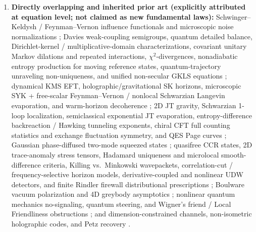 \documentclass[11pt,a4paper]{article}
\theoremstyle{definition}
\theoremstyle{remark}
\newcommand{\1}{\mathbf{1}}
\begin{document}
\begin{enumerate}
  \item \textbf{Directly overlapping and inherited prior art (explicitly attributed at equation level; not claimed as new fundamental laws):} Schwinger--Keldysh / Feynman--Vernon influence functionals and microscopic noise normalizations \cite{Schwinger1961,Keldysh1964,FeynmanVernon1963,CaldeiraLeggett1983,WuLee2005,SiebererBuchholdDiehl2016,Sieberer2023}; Davies weak-coupling semigroups, quantum detailed balance, Dirichlet-kernel / multiplicative-domain characterizations, covariant unitary Markov dilations and repeated interactions, $\chi^2$-divergences, nonadiabatic entropy production for moving reference states, quantum-trajectory unraveling non-uniqueness, and unified non-secular GKLS equations \cite{Davies1974,Alicki1976,Lindblad1976,GKS1976,Evans1977,Frigerio1978,Frigerio1985,WisemanDiosi2001,AttalJoye2007,Temme2010,ChetriteMallick2012,HorowitzSagawa2014,AlhambraWoods2017,Trushechkin2021}; dynamical KMS EFT, holographic/gravitational SK horizons, microscopic SYK + free-scalar Feynman--Vernon / nonlocal Schwarzian Langevin evaporation, and warm-horizon decoherence \cite{CrossleyGloriosoLiu2017,GloriosoCrossleyLiu2017,LiuGlorioso2018,JanaLoganayagamRangamani2020,ColinEllerin2021,ColinEllerin2021b,Gaikwad2023,DSW2023,WilsonGerow2024}; 2D JT gravity, Schwarzian 1-loop localization, semiclassical exponential JT evaporation, entropy-difference backreaction / Hawking tunneling exponents, chiral CFT full counting statistics and exchange fluctuation symmetry, and QES Page curves \cite{Teitelboim1983,Jackiw1985,MassarParentani2000,ParikhWilczek2000,BernardDoyon2012,BernardDoyon2015,MSY2016,StanfordWitten2017,Mertens2019,AEMM2019,Penington2020,AlmheiriIslands2020,MertensTuriaci2023}; Gaussian phase-diffused two-mode squeezed states \cite{SperlingVogel2012}; quasifree CCR states, 2D trace-anomaly stress tensors, Hadamard uniqueness and microlocal smooth-difference criteria, Killing vs.\ Minkowski wavepackets, correlation-cut / frequency-selective horizon models, derivative-coupled and nonlinear UDW detectors, and finite Rindler firewall distributional prescriptions \cite{ArakiShiraishi1971,Polyakov1981,ChristensenFulling1977,RST1992,FabbriNavarroSalas2005,KayWald1991,Radzikowski1996,LoukoSatz2008,Bruschi2010,MaldacenaSusskind2013,JuarezAubryLouko2014,Louko2014,Sanders2015,Ho2016,Zambianco2026}; Boulware vacuum polarization and 4D greybody asymptotics \cite{ReggeWheeler1957,Zerilli1970,Teukolsky1973,Boulware1975,Unruh1976Abs,Page1976,Candelas1980,DasGibbonsMathur1997,GoldbergerRothstein2006,Crispino2007}; nonlinear quantum mechanics no-signaling, quantum steering, and Wigner's friend / Local Friendliness obstructions \cite{Gisin1990,WisemanJonesDoherty2007,FrauchigerRenner2018,Bong2020,AdlamRovelli2022,HausmannRenner2025}; and dimension-constrained channels, non-isometric holographic codes, and Petz recovery \cite{Akers2022,Schumacher1996,Petz1986,FarberGour2026}.

\end{enumerate}
\end{document}

